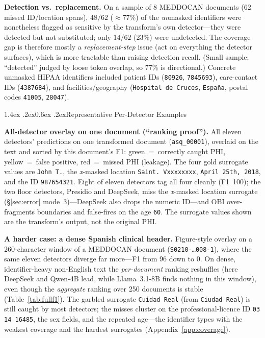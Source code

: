 \documentclass[11pt]{article}
\makeatletter
\newcommand{\hg}[1]{\colorbox{hgreen}{#1}}
\newcommand{\hy}[1]{\colorbox{hyellow}{#1}}
\newcommand{\hr}[1]{\colorbox{hred}{#1}}
\renewcommand\section{\@startsection{section}{1}{\z@}%
  {1.4ex \@plus.2ex}{0.6ex \@plus.2ex}{\normalfont\large\bfseries}}
\newcommand{\tp}[1]{\texttt{#1}}
\makeatother
\begin{document}
\textbf{Detection vs.\ replacement.} On a sample of 8 MEDDOCAN documents (62 missed ID/location spans), $48/62$ ($\approx$77\%) of the \emph{un}masked identifiers were nonetheless flagged as sensitive by the transform's own detector---they were detected but not substituted; only $14/62$ (23\%) were undetected. The coverage gap is therefore mostly a \emph{replacement-step} issue (act on everything the detector surfaces), which is more tractable than raising detection recall. (Small sample; ``detected'' judged by loose token overlap, so 77\% is directional.) Concrete unmasked HIPAA identifiers included patient IDs (\tp{80926}, \tp{7845693}), care-contact IDs (\tp{4387684}), and facilities/geography (\tp{Hospital de Cruces}, \tp{Espa\~na}, postal codes \tp{41005}, \tp{28047}).

\section{Representative Per-Detector Examples}\label{app:examples}

\textbf{All-detector overlay on one document (``ranking proof'').} All eleven detectors' predictions on one transformed document (\tp{asq\_00001}), overlaid on the text and sorted by this document's F1: \hg{green}~=~correctly caught PHI, \hy{yellow}~=~false positive, \hr{red}~=~missed PHI (leakage). The four gold surrogate values are \tp{John T.}, the \emph{x}-masked location \tp{Saint. Vxxxxxxxx}, \tp{April 25th, 2018}, and the ID \tp{987654321}. Eight of eleven detectors tag all four cleanly (F1~100); the two floor detectors, Presidio and DeepSeek, miss the \emph{x}-masked location surrogate (§\ref{sec:error} mode~3)---DeepSeek also drops the numeric ID---and OBI over-fragments boundaries and false-fires on the age \tp{60}. The surrogate values shown are the transform's output, not the original PHI.

{\footnotesize
\setlength{\fboxsep}{1pt}%
\newcommand{\panel}[3]{\par\vspace{2.5pt}\noindent\fcolorbox{cline}{white}{\parbox{0.965\linewidth}{%
\textbf{#1}\hfill{\scriptsize\color{cmuted}#2}\\[2pt]\ttfamily\scriptsize #3}}}

\par}
\vspace{4pt}

\textbf{A harder case: a dense Spanish clinical header.} Figure-style overlay on a 260-character window of a MEDDOCAN document (\tp{S0210-\dots008-1}), where the same eleven detectors diverge far more---F1 from 96 down to 0. On dense, identifier-heavy non-English text the \emph{per-document} ranking reshuffles (here DeepSeek and Qwen-4B lead, while Llama~3.1-8B finds nothing in this window), even though the \emph{aggregate} ranking over 250 documents is stable (Table~\ref{tab:fullf1}). The garbled surrogate \tp{Cuidad Real} (from \tp{Ciudad Real}) is still caught by most detectors; the misses cluster on the professional-licence ID \tp{03 14 16485}, the sex fields, and the repeated age---the identifier types with the weakest coverage and the hardest surrogates (Appendix~\ref{app:coverage}).
\end{document}
